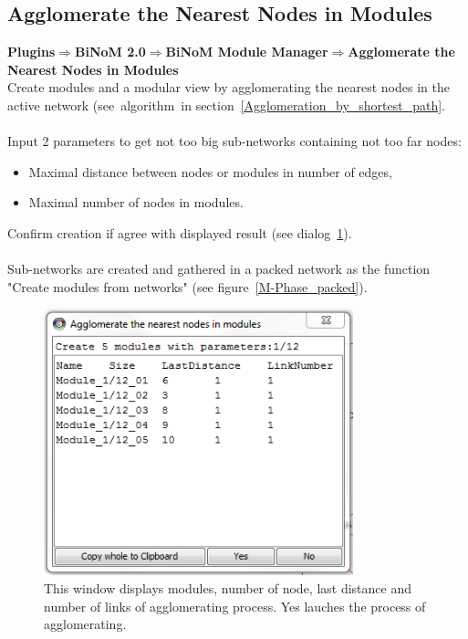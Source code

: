 \subsection{Agglomerate the Nearest Nodes in Modules}
\textbf{Plugins$\Rightarrow$BiNoM 2.0$\Rightarrow$BiNoM Module Manager$\Rightarrow$Agglomerate the Nearest Nodes in Modules}\\
Create modules and a modular view by agglomerating the nearest nodes in the active network (see~algorithm~in section~\ref{Agglomeration_by_shortest_path}.\\\\
Input 2 parameters to get not too big sub-networks containing not too far nodes:
\begin{itemize}
\item Maximal distance between nodes or modules in number of edges,
\item Maximal number of nodes in modules.
\end{itemize}
Confirm creation if agree with displayed result (see dialog~\ref{Agglomerate_in_modules_dialog}).\\\\
Sub-networks are created and gathered in a packed network as the function "Create modules from networks" (see figure~\ref{M-Phase_packed}).
\begin{figure}
\centering
\includegraphics[width=0.8\textwidth]{graphics/Agglomerate_in_modules_dialog}
\caption{This window displays modules, number of node, last distance and number of links of agglomerating process. Yes lauches the process of agglomerating.}
\label{Agglomerate_in_modules_dialog}
\end{figure}
